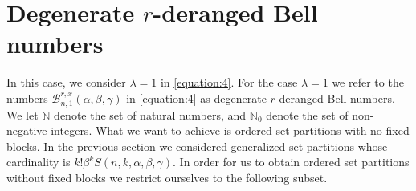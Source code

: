 \documentclass[12pt]{amsart}
\newtheorem{proof 1}{proof 1}
\begin{document}
\section{Degenerate $r$-deranged Bell numbers\label{section:2}}
In this case, we consider $\lambda=1$ in \eqref{equation:4}. For the case $\lambda=1$ we refer to the numbers $\mathcal{B}^{r,x}_{n,1}(\alpha,\beta,\gamma)$ in \eqref{equation:4} as degenerate $r$-deranged Bell numbers. We let $\mathbb{N}$ denote the set of natural numbers, and $\mathbb{N}_0$ denote the set of non-negative integers. What we want to achieve is ordered set partitions with no fixed blocks. In the previous section we considered generalized set partitions whose cardinality is  $k!\beta^kS(n,k,\alpha,\beta,\gamma)$. In order for us to obtain ordered set partitions without fixed blocks we restrict ourselves to the following subset. 
\end{document}
